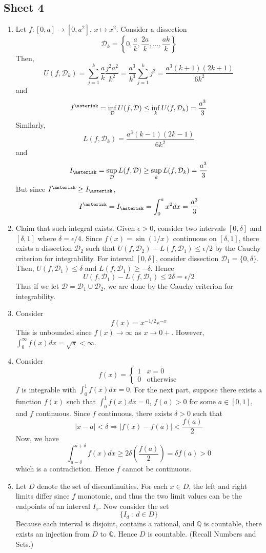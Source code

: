 \documentclass[10pt, a4paper, twoside]{report}
\begin{document}
\subsection{Sheet 4}
\begin{enumerate}[{1.}]
    \item Let \(f:[0,a]\to[0,a^2]\), \(x\mapsto x^2\). Consider a dissection 
    \[\mathcal{D}_k=\left\{0,\frac ak,\frac {2a}k,\ldots,\frac{ak}k\right\}\]
    Then,
    \[U(f,\mathcal{D}_k)=\sum_{j=1}^{k}\frac ak\frac{j^2a^2}{k^2}=\frac{a^3}{k^3}\sum_{j=1}^{k}j^2=\frac{a^3(k+1)(2k+1)}{6k^2}\]
    and 
    \[I^\asterisk=\inf_\mathcal{D}U(f,\mathcal{D})\leq\inf_kU(f,\mathcal{D}_k)=\frac {a^3}3\]
    Similarly,
    \[L(f,\mathcal{D}_k)=\frac{a^3(k-1)(2k-1)}{6k^2}\]
    and 
    \[I_\asterisk=\sup_\mathcal{D}L(f,\mathcal{D})\geq\sup_kL(f,\mathcal{D}_k)=\frac {a^3}3\]
    But since \(I^\asterisk\geq I_\asterisk\),
    \[I^\asterisk=I_\asterisk=\int_0^ax^2dx=\frac{a^3}{3}\]
    \item Claim that such integral exists. Given \(\epsilon>0\), consider two intervals \([0,\delta]\) and \([\delta,1]\) where \(\delta=\epsilon/4\). Since \(f(x)=\sin(1/x)\) continuous on \([\delta,1]\), there exists a dissection \(\mathcal{D}_2\) such that \(U(f,\mathcal{D}_2)-L(f,\mathcal{D}_1)\leq\epsilon/2\) by the Cauchy criterion for integrability. For interval \([0,\delta]\), consider dissection \(\mathcal{D}_1=\{0,\delta\}\). Then, \(U(f,\mathcal{D}_1)\leq\delta\) and \(L(f,\mathcal{D}_1)\geq-\delta\). Hence 
    \[U(f,\mathcal{D}_1)-L(f,\mathcal{D}_1)\leq 2\delta=\epsilon/2\]
    Thus if we let \(\mathcal{D}=\mathcal{D}_1\cup\mathcal{D}_2\), we are done by the Cauchy criterion for integrability.
    \item Consider 
    \[f(x)=x^{-1/2}e^{-x}\]
    This is unbounded since \(f(x)\to\infty\) as \(x\to 0+\). However, \(\int_0^\infty f(x)dx=\sqrt{\pi}<\infty\).
    \item Consider 
    \[f(x)=\begin{cases}
        1 & x=0 \\
        0 & \text{otherwise}
    \end{cases}\]
    \(f\) is integrable with \(\int_0^1f(x)dx=0\). For the next part, suppose there exists a function \(f(x)\) such that \(\int_0^1f(x)dx=0\), \(f(a)>0\) for some \(a\in[0,1]\), and \(f\) continuous. Since \(f\) continuous, there exists \(\delta>0\) such that 
    \[|x-a|<\delta\Rightarrow|f(x)-f(a)|<\frac{f(a)}{2}\]
    Now, we have 
    \[\int_{a-\delta}^{a+\delta}f(x)dx\geq 2\delta \left(\frac{f(a)}{2}\right)=\delta f(a)>0\]
    which is a contradiction. Hence \(f\) cannot be continuous.
    \item Let \(D\) denote the set of discontinuities. For each \(x\in D\), the left and right limits differ since \(f\) monotonic, and thus the two limit values can be the endpoints of an interval \(I_x\). Now consider the set 
    \[\{I_d\::\:d\in D\}\]
    Because each interval is disjoint, contains a rational, and \(\mathbb{Q}\) is countable, there exists an injection from \(D\) to \(\mathbb{Q}\). Hence \(D\) is countable. (Recall Numbers and Sets.)


\end{enumerate}
\end{document}
